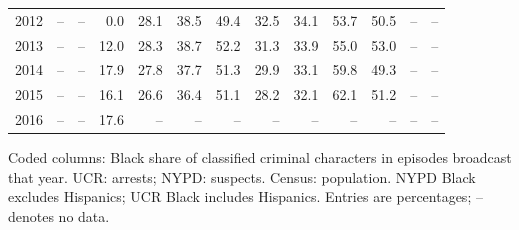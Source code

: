\begin{center}
\begin{tabular}{@{}rrrrrrrrrrrrr@{}}
2012 & -- & -- & 0.0 & 28.1 & 38.5 & 49.4 & 32.5 & 34.1 & 53.7 & 50.5 & -- & -- \\
2013 & -- & -- & 12.0 & 28.3 & 38.7 & 52.2 & 31.3 & 33.9 & 55.0 & 53.0 & -- & -- \\
2014 & -- & -- & 17.9 & 27.8 & 37.7 & 51.3 & 29.9 & 33.1 & 59.8 & 49.3 & -- & -- \\
2015 & -- & -- & 16.1 & 26.6 & 36.4 & 51.1 & 28.2 & 32.1 & 62.1 & 51.2 & -- & -- \\
2016 & -- & -- & 17.6 & -- & -- & -- & -- & -- & -- & -- & -- & -- \\
\bottomrule
\end{tabular}
\par\smallskip
\parbox{\linewidth}{\footnotesize\raggedright Coded columns: Black share of classified criminal characters in episodes broadcast that year.  UCR: arrests; NYPD: suspects. Census: population. NYPD Black excludes Hispanics; UCR Black includes Hispanics. Entries are percentages; -- denotes no data.}
\end{center}
